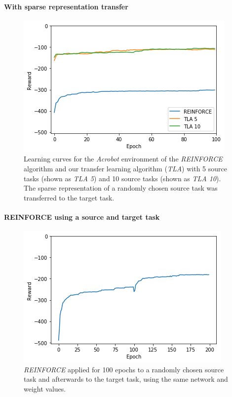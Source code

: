 \paragraph{With sparse representation transfer} %
\label{par:acrobot:with_sparse_representation_transfer}
\begin{figure}[H]
    \centering
    \includegraphics[width=.8\linewidth]{images/results/Acrobot/sparse_transfer/reward_target_re-akt5-akt10.png}
    \caption[Learning curves for the \textit{Acrobot} environment of \textit{REINFORCE} and \textit{TLA} using sparse representation transfer]{Learning curves for the \emph{Acrobot} environment of the \textit{REINFORCE} algorithm and our transfer learning algorithm (\textit{TLA}) with 5 source tasks (shown as \textit{TLA 5}) and 10 source tasks (shown as \textit{TLA 10}). The sparse representation of a randomly chosen source task was transferred to the target task.}
    \label{fig:Acrobot:st:reward_target_re-akt5-akt10}
\end{figure}
\paragraph{REINFORCE using a source and target task} %
\label{par:reinforce_using_a_source_and_target_task}
\begin{figure}[H]
    \centering
    \includegraphics[width=.8\linewidth]{images/results/Acrobot/reinforce_2tasks.png}
    \caption{\textit{REINFORCE} applied for 100 epochs to a randomly chosen source task and afterwards to the target task, using the same network and weight values.}
    \label{fig:Acrobot:reward_reinforce_2tasks}
\end{figure}
